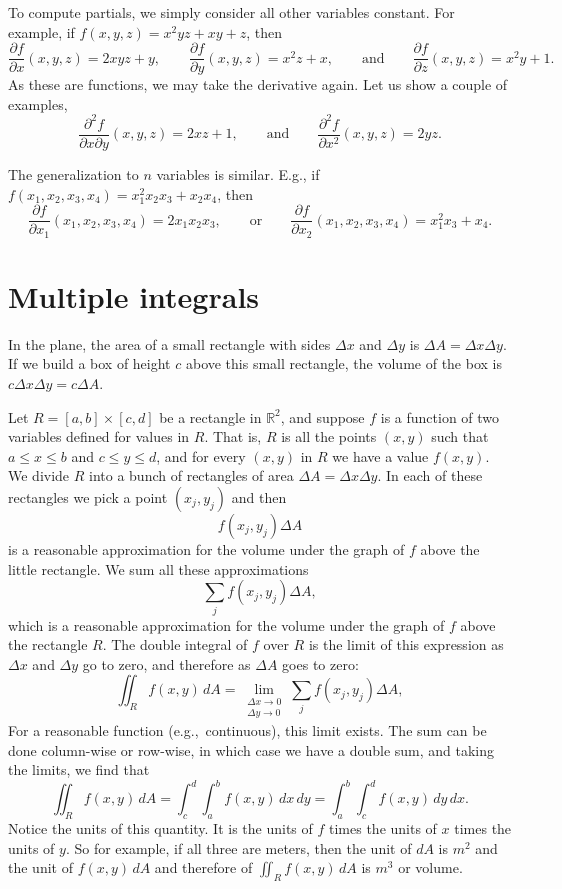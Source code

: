 \documentclass[12pt]{article}
\newcommand{\R}{{\mathbb{R}}}
\begin{document}
To compute partials, we simply consider all other variables constant.
For example, if $f(x,y,z) = x^2yz + xy + z$, then
\[
\frac{\partial f}{\partial x}(x,y,z) = 2xyz + y,
\qquad
\frac{\partial f}{\partial y}(x,y,z) = x^2z + x,
\qquad \text{and} \qquad
\frac{\partial f}{\partial z}(x,y,z) = x^2y + 1 .
\]
As these are functions, we may take the derivative again.  Let us show a couple of examples,
\[
\frac{\partial^2 f}{\partial x \partial y}(x,y,z) = 2xz + 1,
\qquad \text{and} \qquad
\frac{\partial^2 f}{\partial x^2}(x,y,z) = 2yz .
\]

The generalization to $n$ variables is similar.  E.g.,
if $f(x_1,x_2,x_3,x_4) = x_1^2x_2x_3 + x_2 x_4$, then
\[
\frac{\partial f}{\partial x_1}(x_1,x_2,x_3,x_4) = 2x_1 x_2 x_3,
\qquad \text{or} \qquad
\frac{\partial f}{\partial x_2}(x_1,x_2,x_3,x_4) = x_1^2 x_3 + x_4 .
\]

\section{Multiple integrals}

In the plane, the area of a small rectangle with sides $\Delta x$ and $\Delta y$
is $\Delta A = \Delta x \Delta y$.
If we build a box of height $c$ above
this small rectangle, the volume of the box is $c \Delta x \Delta y = c \Delta A$.

Let $R = [a,b] \times [c,d]$ be a rectangle in $\R^2$, and suppose
$f$ is a function of two variables defined for values in $R$.
That is, $R$ is all the points
$(x,y)$ such that $a \leq x \leq b$ and $c \leq y \leq d$,
and for every $(x,y)$ in $R$ we have a value $f(x,y)$.
We divide $R$ into a bunch of rectangles of area $\Delta A = \Delta x \Delta y$.
In each of these rectangles we pick a point $(x_j,y_j)$ and then
\[
f(x_j,y_j) \Delta A
\]
is a reasonable approximation for the volume under the graph of $f$ above the little
rectangle.
We sum all these approximations
\[
\sum_j 
f(x_j,y_j) \Delta A ,
\]
which is a reasonable approximation for the volume under the graph of $f$ above the rectangle
$R$.
The double integral of $f$ over $R$ is the limit of
this expression
as $\Delta x$ and $\Delta y$ go to zero,
and therefore as $\Delta A$ goes to zero:
\[
\iint_R f(x,y) \, dA =
\lim_{\substack{\Delta x \to 0 \\ \Delta y \to 0}}
\sum_j 
f(x_j,y_j) \Delta A ,
\]
For a reasonable function (e.g.,\ continuous), this limit exists.
The sum can be done column-wise or row-wise, in which case we have a
double sum, and taking the limits, we find that
\[
\iint_R f(x,y) \, dA
=
\int_c^d \int_a^b f(x,y) \, dx \, dy
=
\int_a^b \int_c^d f(x,y) \, dy \, dx .
\]
Notice the units of this quantity.  It is the units of $f$ times the units of $x$ times
the units of $y$.  So for example, if all three are meters, then the unit of $dA$ is $m^2$ and
the unit of
$f(x,y) \, dA$
and therefore of
$\iint_R f(x,y) \, dA$
is $m^3$ or volume.
\end{document}
